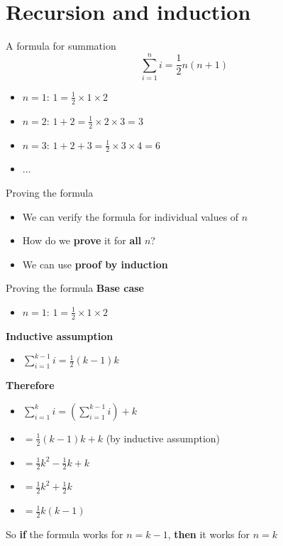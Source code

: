 \part{Recursion and induction}
\frame{\partpage}

\begin{frame}{A formula for summation}
	$$ \sum_{i=1}^n i = \frac12 n (n+1) $$
	\pause
	\begin{itemize}
		\pause\item $n=1$: $1 = \frac12 \times 1 \times 2$
		\pause\item $n=2$: $1+2 = \frac12 \times 2 \times 3 = 3$
		\pause\item $n=3$: $1+2+3 = \frac12 \times 3 \times 4 = 6$
		\pause\item ...
	\end{itemize}
\end{frame}

\begin{frame}{Proving the formula}
	\begin{itemize}
		\pause\item We can verify the formula for individual values of $n$
		\pause\item How do we \textbf{prove} it for \textbf{all} $n$?
		\pause\item We can use \textbf{proof by induction}
	\end{itemize}
\end{frame}

\begin{frame}{Proving the formula}
	\pause\textbf{Base case}
	\begin{itemize}
		\pause\item $n=1$: $1 = \frac12 \times 1 \times 2$
	\end{itemize}
	\pause\textbf{Inductive assumption}
	\begin{itemize}
		\pause\item $\sum_{i=1}^{k-1} i = \frac12 (k-1) k$
	\end{itemize}
	\pause\textbf{Therefore}
	\begin{itemize}
		\pause\item $\sum_{i=1}^k i = \left( \sum_{i=1}^{k-1} i \right) + k$
		\pause\item $= \frac12 (k-1) k + k$ (by inductive assumption)
		\pause\item $= \frac12 k^2 - \frac12 k + k$
		\pause\item $= \frac12 k^2 + \frac12 k$
		\pause\item $= \frac12 k (k-1)$
	\end{itemize}
	\pause So \textbf{if} the formula works for $n=k-1$, \textbf{then} it works for $n=k$
\end{frame}

